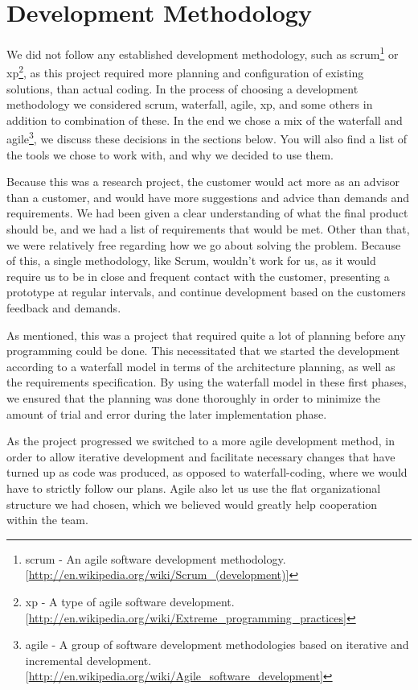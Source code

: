 \section{Development Methodology}\label{Development Methodology} 
    We did not follow any established development methodology, such as \gls{scrum}\footnote{\gls{scrum} - An agile software development methodology. [\url{http://en.wikipedia.org/wiki/Scrum_(development)}]} or \gls{xp}\footnote{\gls{xp} - A type of agile software development. [\url{http://en.wikipedia.org/wiki/Extreme_programming_practices}]}, as this project required more planning and configuration of existing solutions, than actual coding. In the process of choosing a development methodology we considered scrum, waterfall, agile, xp, and some others in addition to combination of these. In the end we chose a mix of the \gls{waterfall} and \gls{agile}\footnote{\gls{agile} - A group of software development methodologies based on iterative and incremental development. [\url{http://en.wikipedia.org/wiki/Agile_software_development}]}, we discuss these decisions in the sections below. You will also 
find a list of the tools we chose to work with, and why we decided to use them. 
    
    Because this was a research project, the customer would act more as an advisor than a customer, and would have more suggestions and advice than demands and requirements. We had been given a clear understanding of what the final product should be, and we had a list of requirements that would be met. Other than that, we were relatively free regarding how we go about solving the problem. Because of this, a single methodology, like Scrum, wouldn't work for us, as it would require us to be in close and frequent contact with the customer, presenting a prototype at regular intervals, and continue development based on the customers feedback and demands.
    
    As mentioned, this was a project that required quite a lot of planning before any programming could be done. This necessitated that we started the development according to a waterfall model in terms of the architecture planning, as well as the requirements specification. By using the waterfall model in these first phases, we ensured that the planning was done thoroughly in order to minimize the amount of trial and error during the later implementation phase.
    
    As the project progressed we switched to a more agile development method, in order to allow iterative development and facilitate necessary changes that have turned up as code was produced, as opposed to waterfall-coding, where we would have to strictly follow our plans. Agile also let us use the flat organizational structure we had chosen, which we believed would greatly help cooperation within the team.
    

